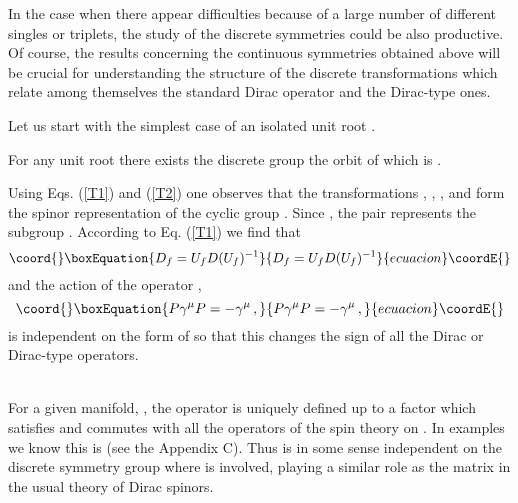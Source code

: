 \documentclass[a4paper,12pt]{article}
\begin{document}
In the case when there appear difficulties because of a large number of 
different singles or triplets, the  study of the discrete symmetries could 
be also productive. Of course, the results concerning the continuous symmetries 
obtained above will be crucial for understanding the structure of the discrete 
transformations which relate among themselves the standard Dirac operator and 
the Dirac-type ones.

Let us start with the simplest case of an isolated unit root \coordHE{}. 
\begin{theor}\label{D1}
For any unit root \coordHE{} there exists the discrete group 
\coordHE{} the orbit of which is \coordHE{}.
\end{theor}
\begin{demo}
Using Eqs. (\ref{T1}) and (\ref{T2}) one observes that the transformations 
\coordHE{}, \coordHE{}, \coordHE{}, and 
\coordHE{} form the spinor representation of 
the cyclic group \coordHE{}. Since  \coordHE{}, the pair \coordHE{} represents 
the subgroup \coordHE{}. According to Eq. (\ref{T1}) 
we find that    
\begin{equation}\coord{}\boxEquation{\label{DUDU}
D_f=U_f D(U_f)^{-1}
}{D_f=U_f D(U_f)^{-1}
}{ecuacion}\coordE{}\end{equation}
and the action of the operator \coordHE{}, 
\begin{equation}\coord{}\boxEquation{\label{pari}
P\gamma^{\mu}P=-\gamma^{\mu}\,,  
}{P\gamma^{\mu}P=-\gamma^{\mu}\,,  
}{ecuacion}\coordE{}\end{equation}
is independent on the form of \coordHE{} so that this changes the sign of all the 
Dirac or Dirac-type  operators.  
\end{demo}\\ 
For a given manifold, \coordHE{}, the operator \coordHE{} is uniquely defined up to a 
factor \coordHE{} which satisfies \coordHE{} and commutes with all the operators of the 
spin theory on \coordHE{}. In examples we know this is \coordHE{} 
(see the Appendix C). 
Thus \coordHE{} is in some sense independent on the discrete symmetry group where is 
involved, playing a similar role as the matrix \coordHE{} in the usual theory 
of Dirac spinors. 
\end{document}
